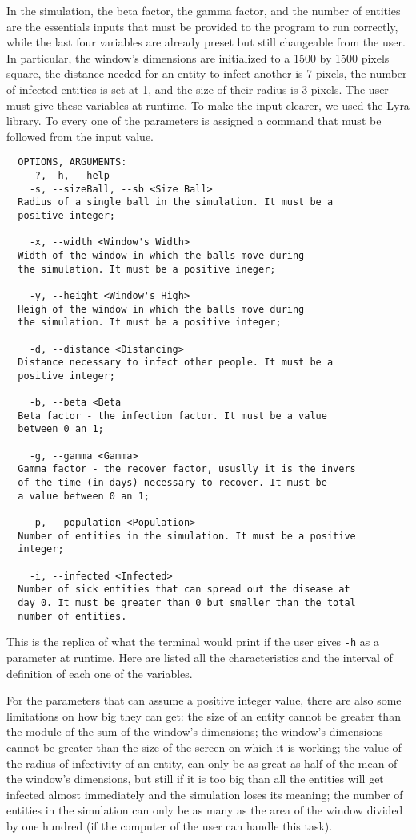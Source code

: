   In the simulation, the beta factor, the gamma factor, and the number of entities are the essentials inputs that must be provided to the program to run correctly, while the last four variables are already preset but still changeable from the user. In particular, the window's dimensions are initialized to a 1500 by 1500 pixels square, the distance needed for an entity to infect another is 7 pixels, the number of infected entities is set at 1, and the size of their radius is 3 pixels. The user must give these variables at runtime. To make the input clearer, we used the \href{https://www.bfgroup.xyz/Lyra/}{Lyra} library. To every one of the parameters is assigned a command that must be followed from the input value.
  \begin{verbatim}
  OPTIONS, ARGUMENTS:
    -?, -h, --help
    -s, --sizeBall, --sb <Size Ball>
  Radius of a single ball in the simulation. It must be a
  positive integer;

    -x, --width <Window's Width>
  Width of the window in which the balls move during
  the simulation. It must be a positive ineger;

    -y, --height <Window's High>
  Heigh of the window in which the balls move during
  the simulation. It must be a positive integer;

    -d, --distance <Distancing>
  Distance necessary to infect other people. It must be a
  positive integer;

    -b, --beta <Beta
  Beta factor - the infection factor. It must be a value
  between 0 an 1;

    -g, --gamma <Gamma>
  Gamma factor - the recover factor, ususlly it is the invers
  of the time (in days) necessary to recover. It must be
  a value between 0 an 1;

    -p, --population <Population>
  Number of entities in the simulation. It must be a positive
  integer;

    -i, --infected <Infected>
  Number of sick entities that can spread out the disease at
  day 0. It must be greater than 0 but smaller than the total
  number of entities.

  \end{verbatim}

  This is the replica of what the terminal would print if the user gives \verb|-h| as a parameter at runtime. Here are listed all the characteristics and the interval of definition of each one of the variables.

  For the parameters that can assume a positive integer value, there are also some limitations on how big they can get: the size of an entity cannot be greater than the module of the sum of the window's dimensions; the window's dimensions cannot be greater than the size of the screen on which it is working; the value of the radius of infectivity of an entity, can only be as great as half of the mean of the window's dimensions, but still if it is too big than all the entities will get infected almost immediately and the simulation loses its meaning; the number of entities in the simulation can only be as many as the area of the window divided by one hundred (if the computer of the user can handle this task).

